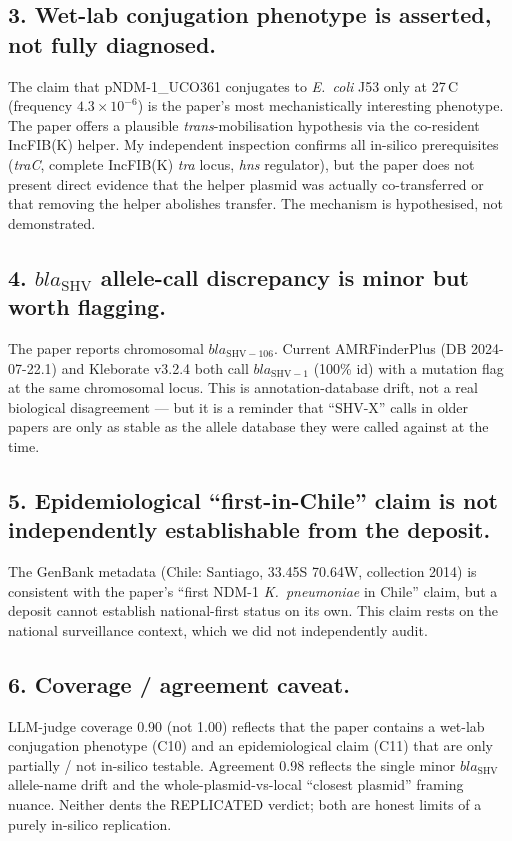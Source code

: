 \documentclass[11pt,letterpaper]{article}
\begin{document}
\subsection*{3. Wet-lab conjugation phenotype is asserted, not fully diagnosed.}
The claim that pNDM-1\_UCO361 conjugates to \textit{E.\ coli} J53 only at 27\,\textdegree C
(frequency $4.3\times10^{-6}$) is the paper's most mechanistically interesting phenotype. The
paper offers a plausible \emph{trans}-mobilisation hypothesis via the co-resident IncFIB(K) helper.
My independent inspection confirms all in-silico prerequisites (\textit{traC}, complete IncFIB(K)
\textit{tra} locus, \textit{hns} regulator), but the paper does not present direct evidence that
the helper plasmid was actually co-transferred or that removing the helper abolishes transfer.
The mechanism is hypothesised, not demonstrated.

\subsection*{4. $bla_{\mathrm{SHV}}$ allele-call discrepancy is minor but worth flagging.}
The paper reports chromosomal $bla_{\mathrm{SHV-106}}$. Current AMRFinderPlus (DB 2024-07-22.1) and
Kleborate v3.2.4 both call $bla_{\mathrm{SHV-1}}$ (100\% id) with a mutation flag at the same
chromosomal locus. This is annotation-database drift, not a real biological disagreement --- but
it is a reminder that ``SHV-X'' calls in older papers are only as stable as the allele database
they were called against at the time.

\subsection*{5. Epidemiological ``first-in-Chile'' claim is not independently establishable from the deposit.}
The GenBank metadata (Chile: Santiago, 33.45\textdegree S 70.64\textdegree W, collection 2014)
is consistent with the paper's ``first NDM-1 \textit{K.\ pneumoniae} in Chile'' claim, but a
deposit cannot establish national-first status on its own. This claim rests on the national
surveillance context, which we did not independently audit.

\subsection*{6. Coverage / agreement caveat.}
LLM-judge coverage 0.90 (not 1.00) reflects that the paper contains a wet-lab conjugation
phenotype (C10) and an epidemiological claim (C11) that are only partially / not in-silico
testable. Agreement 0.98 reflects the single minor $bla_{\mathrm{SHV}}$ allele-name drift and
the whole-plasmid-vs-local ``closest plasmid'' framing nuance. Neither dents the REPLICATED
verdict; both are honest limits of a purely in-silico replication.
\end{document}
